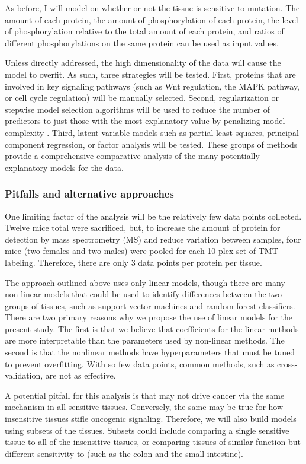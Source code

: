 As before, I will model on whether or not the tissue is sensitive to \KRAS{} mutation. 
The amount of each protein, the amount of phosphorylation of each protein, the level of phosphorylation relative to the total amount of each protein, and ratios of different phosphorylations on the same protein can be used as input values.

Unless directly addressed, the high dimensionality of the data will cause the model to overfit.
As such, three strategies will be tested.
First, proteins that are involved in key signaling pathways (such as Wnt regulation, the MAPK pathway, or cell cycle regulation) will be manually selected.
Second, regularization or stepwise model selection algorithms will be used to reduce the number of predictors to just those with the most explanatory value by penalizing model complexity \cite{Tibshirani1996RegressionLasso., Zou2005RegularizationNet}.
Third, latent-variable models such as partial least squares, principal component regression, or factor analysis will be tested.
These groups of methods provide a comprehensive comparative analysis of the many potentially explanatory models for the data.

\subsubsection*{Pitfalls and alternative approaches}

One limiting factor of the analysis will be the relatively few data points collected.
Twelve mice total were sacrificed, but, to increase the amount of protein for detection by mass spectrometry (MS) and reduce variation between samples, four mice (two females and two males) were pooled for each 10-plex set of TMT-labeling.
Therefore, there are only 3 data points per protein per tissue.

The approach outlined above uses only linear models, though there are many non-linear models that could be used to identify differences between the two groups of tissues, such as support vector machines and random forest classifiers.
There are two primary reasons why we propose the use of linear models for the present study.
The first is that we believe that coefficients for the linear methods are more interpretable than the parameters used by non-linear methods.
The second is that the nonlinear methods have hyperparameters that must be tuned to prevent overfitting.
With so few data points, common methods, such as cross-validation, are not as effective.

A potential pitfall for this analysis is that \KRAS{} may not drive cancer via the same mechanism in all \KRAS{} sensitive tissues.
Conversely, the same may be true for how insensitive tissues stifle oncogenic \kras{} signaling.
Therefore, we will also build models using subsets of the tissues.
Subsets could include comparing a single sensitive tissue to all of the insensitive tissues, or comparing tissues of similar function but different sensitivity to \KRAS{} (such as the colon and the small intestine).

